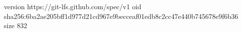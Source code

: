 version https://git-lfs.github.com/spec/v1
oid sha256:6ba2ae205bff1d977d21cd967e9becceaf01edb8c2cc47e440b745678e9f6b36
size 832
